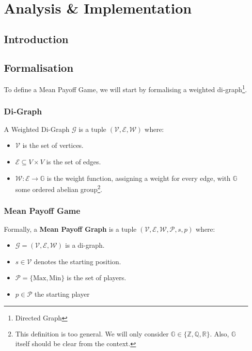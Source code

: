 \chapter{Analysis \& Implementation}
\section{Introduction}

\section{Formalisation}
To define a Mean Payoff Game, we will start by formalising a weighted di-graph\footnote{Directed Graph}.

\subsection{Di-Graph}
A Weighted Di-Graph $\mathcal{G}$ is a tuple $(\mathcal{V},\mathcal{E},\mathcal{W})$ where:

\begin{itemize}
		\item $\mathcal{V}$ is the set of vertices.
		\item $\mathcal{E} \subseteq V\times V$ is the set of edges.
		\item $\mathcal{W}:\mathcal{E}\rightarrow \mathbb{G}$ is the weight function, assigning a weight for every edge, with $\mathbb{G}$ some ordered abelian group\footnote{This definition is too general. We will only consider $\mathbb{G}\in \{\mathbb{Z},\mathbb{Q},\mathbb{R}\}.$ Also, $\mathbb{G}$ itself should be clear from the context.}. 
\end{itemize}
\subsection{Mean Payoff Game}
Formally, a \textbf{Mean Payoff Graph} is a tuple $(\mathcal{V},\mathcal{E},\mathcal{W},\mathcal{P},s,p)$ where:
\begin{itemize}
	\item $\mathcal{G}=(\mathcal{V},\mathcal{E},\mathcal{W})$ is a di-graph.
		\item $s\in \mathcal{V}$ denotes the starting position.
	\item $\mathcal{P}=\{\text{Max},\text{Min}\}$ is the set of players.
	\item $p\in \mathcal{P}$ the starting player
\end{itemize}


